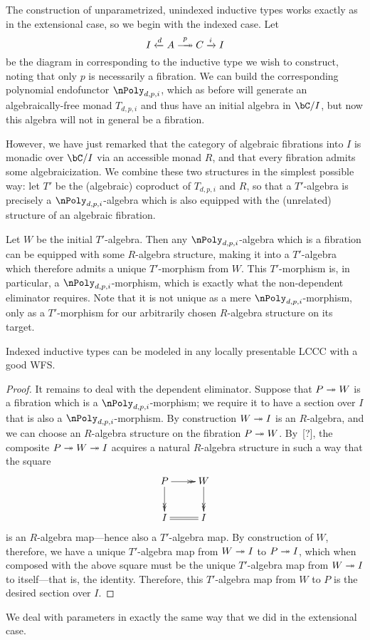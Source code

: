 \documentclass{amsart}
\begin{document}

The construction of unparametrized, unindexed inductive types works exactly as in the extensional case, so we begin with the indexed case.
Let 
\[ I \xot{d} A \xfib{p} C \xto{i} I \]
be the diagram in \bC corresponding to the inductive type we wish to construct, noting that only $p$ is necessarily a fibration.
We can build the corresponding polynomial endofunctor $\nPoly_{d,p,i}$, which as before will generate an algebraically-free monad $T_{d,p,i}$ and thus have an initial algebra in $\bC/I$, but now this algebra will not in general be a fibration.

However, we have just remarked that the category of algebraic fibrations into $I$ is monadic over $\bC/I$ via an accessible monad $R$, and that every fibration admits some algebraicization.
We combine these two structures in the simplest possible way: let $T'$ be the (algebraic) coproduct of $T_{d,p,i}$ and $R$, so that a $T'$-algebra is precisely a $\nPoly_{d,p,i}$-algebra which is also equipped with the (unrelated) structure of an algebraic fibration.

Let $W$ be the initial $T'$-algebra.
Then any $\nPoly_{d,p,i}$-algebra which is a fibration can be equipped with some $R$-algebra structure, making it into a $T'$-algebra which therefore admits a unique $T'$-morphism from $W$.
This $T'$-morphism is, in particular, a $\nPoly_{d,p,i}$-morphism, which is exactly what the non-dependent eliminator requires.
Note that it is not unique as a mere $\nPoly_{d,p,i}$-morphism, only as a $T'$-morphism for our arbitrarily chosen $R$-algebra structure on its target.

\begin{thm}
  Indexed inductive types can be modeled in any locally presentable LCCC with a good WFS.
\end{thm}
\begin{proof}
  It remains to deal with the dependent eliminator.
  Suppose that $P\twoheadrightarrow W$ is a fibration which is a $\nPoly_{d,p,i}$-morphism; we require it to have a section over $I$ that is also a $\nPoly_{d,p,i}$-morphism.
  By construction $W\twoheadrightarrow I$ is an $R$-algebra, and we can choose an $R$-algebra structure on the fibration $P\twoheadrightarrow W$.
  By~[?], the composite $P\twoheadrightarrow W \twoheadrightarrow I$ acquires a natural $R$-algebra structure in such a way that the square
  \[ \xymatrix{ P \ar@{->>}[r] \ar@{->>}[d] & W \ar@{->>}[d] \\ I \ar@{=}[r] & I } \]
  is an $R$-algebra map---hence also a $T'$-algebra map.
  By construction of $W$, therefore, we have a unique $T'$-algebra map from $W\twoheadrightarrow I$ to $P\twoheadrightarrow I$, which when composed with the above square must be the unique $T'$-algebra map from $W\twoheadrightarrow I$ to itself---that is, the identity.
  Therefore, this $T'$-algebra map from $W$ to $P$ is the desired section over $I$.
\end{proof}

We deal with parameters in exactly the same way that we did in the extensional case.





\end{document}
